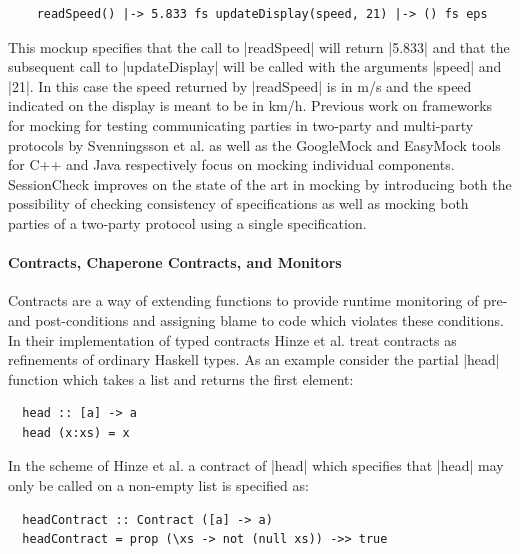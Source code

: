 \documentclass{article}
\begin{document}
\begin{minipage}{\linewidth}
  \begin{verbatim}
    readSpeed() |-> 5.833 fs updateDisplay(speed, 21) |-> () fs eps
\end{verbatim}
\end{minipage}

%
This mockup specifies that the call to |readSpeed| will return |5.833| and that
the subsequent call to |updateDisplay| will be called with the arguments
|speed| and |21|.
%
In this case the speed returned by |readSpeed| is in m/s and the speed indicated
on the display is meant to be in km/h.
%
Previous work on frameworks for mocking for testing communicating parties
in two-party and multi-party protocols by Svenningsson et al. \cite{HughesMocking}
as well as the GoogleMock \cite{GoogleMock} and EasyMock \cite{EasyMock} tools
for C++ and Java respectively focus on mocking individual components.
%
SessionCheck improves on the state of the art in mocking by introducing
both the possibility of checking consistency of specifications as well as
mocking both parties of a two-party protocol using a single specification.
%

\paragraph{Contracts, Chaperone Contracts, and Monitors}
%
Contracts \cite{Contracts} are a way of extending functions to provide runtime 
monitoring of pre- and post-conditions and assigning blame to code which
violates these conditions.
%
In their implementation of typed contracts Hinze et al. \cite{ContractsHinze}
treat contracts as refinements of ordinary Haskell types.
%
As an example consider the partial |head| function which takes a list and
returns the first element:
%

\begin{minipage}{\linewidth}
  \begin{verbatim}
  head :: [a] -> a
  head (x:xs) = x
\end{verbatim}
\end{minipage}

%
In the scheme of Hinze et al. a contract of |head| which specifies that |head|
may only be called on a non-empty list is specified as:
%

\begin{minipage}{\linewidth}
  \begin{verbatim}
  headContract :: Contract ([a] -> a)
  headContract = prop (\xs -> not (null xs)) ->> true
\end{verbatim}
\end{minipage}
\end{document}
